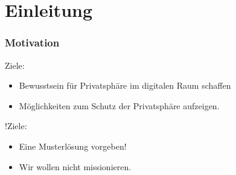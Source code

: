 \section{Einleitung}

\begin{frame}
  \frametitle{Motivation}

  Ziele:
  \begin{itemize}
   \item Bewusstsein für Privatsphäre im digitalen Raum schaffen
   \item Möglichkeiten zum Schutz der Privatsphäre aufzeigen.
  \end{itemize}

  \vspace{2ex}

  !Ziele:
  \begin{itemize}
    \item Eine Musterlösung vorgeben!
    \item Wir wollen nicht missionieren.
  \end{itemize}
\end{frame}

